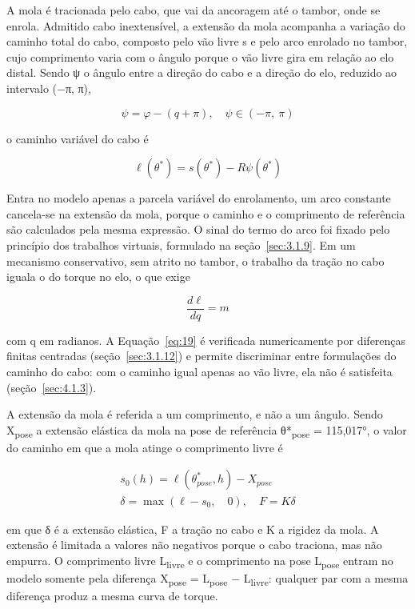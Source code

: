 A mola é tracionada pelo cabo, que vai da ancoragem até o tambor, onde se enrola. Admitido cabo inextensível, a extensão da mola acompanha a variação do caminho total do cabo, composto pelo vão livre s e pelo arco enrolado no tambor, cujo comprimento varia com o ângulo porque o vão livre gira em relação ao elo distal. Sendo ψ o ângulo entre a direção do cabo e a direção do elo, reduzido ao intervalo (−π, π),

\begin{equation}
  \psi = \varphi - (q + \pi),\quad\psi \in ( - \pi,\ \pi)
  \label{eq:17}
\end{equation}

o caminho variável do cabo é

\begin{equation}
  \ell(\theta^{*}) = s(\theta^{*}) - R\psi(\theta^{*})
  \label{eq:18}
\end{equation}

Entra no modelo apenas a parcela variável do enrolamento, um arco constante cancela-se na extensão da mola, porque o caminho e o comprimento de referência são calculados pela mesma expressão. O sinal do termo do arco foi fixado pelo princípio dos trabalhos virtuais, formulado na seção~\ref{sec:3.1.9}. Em um mecanismo conservativo, sem atrito no tambor, o trabalho da tração no cabo iguala o do torque no elo, o que exige

\begin{equation}
  \frac{d\ell}{dq} = m
  \label{eq:19}
\end{equation}

com q em radianos. A Equação~\eqref{eq:19} é verificada numericamente por diferenças finitas centradas (seção~\ref{sec:3.1.12}) e permite discriminar entre formulações do caminho do cabo: com o caminho igual apenas ao vão livre, ela não é satisfeita (seção~\ref{sec:4.1.3}).

A extensão da mola é referida a um comprimento, e não a um ângulo. Sendo X\textsubscript{pose} a extensão elástica da mola na pose de referência θ*\textsubscript{pose} = 115,017°, o valor do caminho em que a mola atinge o comprimento livre é

\begin{gather}
  s_{0}(h) = \ell(\theta_{pose}^{*},h) - X_{pose} \label{eq:20} \\
  \delta = \max{(\ell - s_{0},\quad 0)},\quad F = K\delta \label{eq:21}
\end{gather}

em que δ é a extensão elástica, F a tração no cabo e K a rigidez da mola. A extensão é limitada a valores não negativos porque o cabo traciona, mas não empurra. O comprimento livre L\textsubscript{livre} e o comprimento na pose L\textsubscript{pose} entram no modelo somente pela diferença X\textsubscript{pose} = L\textsubscript{pose} − L\textsubscript{livre}: qualquer par com a mesma diferença produz a mesma curva de torque.

